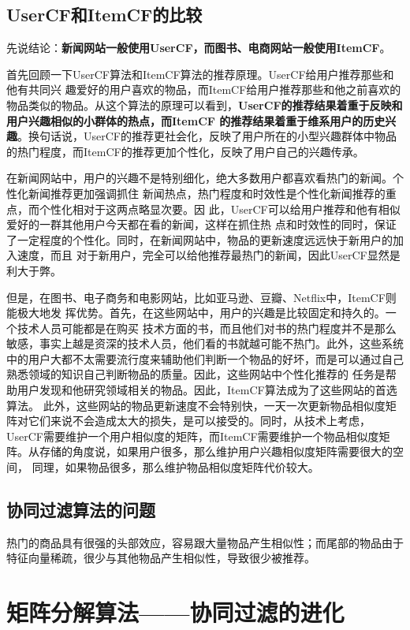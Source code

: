\documentclass[12pt]{article}
\begin{document}
\subsection{UserCF和ItemCF的比较}
先说结论：\textbf{新闻网站一般使用UserCF，而图书、电商网站一般使用ItemCF}。

首先回顾一下UserCF算法和ItemCF算法的推荐原理。UserCF给用户推荐那些和他有共同兴 趣爱好的用户喜欢的物品，而ItemCF给用户推荐那些和他之前喜欢的物品类似的物品。从这个算法的原理可以看到，\textbf{UserCF的推荐结果着重于反映和用户兴趣相似的小群体的热点，而ItemCF 的推荐结果着重于维系用户的历史兴趣}。换句话说，UserCF的推荐更社会化，反映了用户所在的小型兴趣群体中物品的热门程度，而ItemCF的推荐更加个性化，反映了用户自己的兴趣传承。

在新闻网站中，用户的兴趣不是特别细化，绝大多数用户都喜欢看热门的新闻。个性化新闻推荐更加强调抓住 新闻热点，热门程度和时效性是个性化新闻推荐的重点，而个性化相对于这两点略显次要。因 此，UserCF可以给用户推荐和他有相似爱好的一群其他用户今天都在看的新闻，这样在抓住热 点和时效性的同时，保证了一定程度的个性化。同时，在新闻网站中，物品的更新速度远远快于新用户的加入速度，而且 对于新用户，完全可以给他推荐最热门的新闻，因此UserCF显然是利大于弊。

但是，在图书、电子商务和电影网站，比如亚马逊、豆瓣、Netflix中，ItemCF则能极大地发 挥优势。首先，在这些网站中，用户的兴趣是比较固定和持久的。一个技术人员可能都是在购买 技术方面的书，而且他们对书的热门程度并不是那么敏感，事实上越是资深的技术人员，他们看的书就越可能不热门。此外，这些系统中的用户大都不太需要流行度来辅助他们判断一个物品的好坏，而是可以通过自己熟悉领域的知识自己判断物品的质量。因此，这些网站中个性化推荐的 任务是帮助用户发现和他研究领域相关的物品。因此，ItemCF算法成为了这些网站的首选算法。 此外，这些网站的物品更新速度不会特别快，一天一次更新物品相似度矩阵对它们来说不会造成太大的损失，是可以接受的。同时，从技术上考虑，UserCF需要维护一个用户相似度的矩阵，而ItemCF需要维护一个物品相似度矩阵。从存储的角度说，如果用户很多，那么维护用户兴趣相似度矩阵需要很大的空间， 同理，如果物品很多，那么维护物品相似度矩阵代价较大。

\subsection{协同过滤算法的问题}
热门的商品具有很强的头部效应，容易跟大量物品产生相似性；而尾部的物品由于特征向量稀疏，很少与其他物品产生相似性，导致很少被推荐。

\section{矩阵分解算法——协同过滤的进化}
\end{document}
